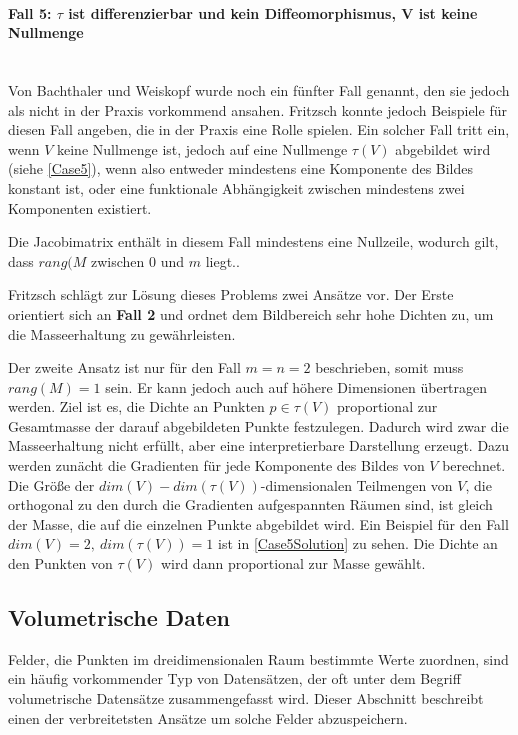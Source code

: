 \documentclass[a4paper,fontsize=12pt,toc=bib,parskip=half,ngerman]{scrartcl}
\begin{document}
\paragraph{Fall 5: $\tau$ ist differenzierbar und kein Diffeomorphismus, V ist keine Nullmenge}\hspace{200pt}\\
Von Bachthaler und Weiskopf wurde noch ein f\"unfter Fall genannt, den sie jedoch als nicht in der Praxis vorkommend ansahen. Fritzsch konnte jedoch Beispiele f\"ur diesen Fall angeben\cite[S.~23~f.]{fritzsch2016continuousScatterplot}, die in der Praxis eine Rolle spielen. Ein solcher Fall tritt ein, wenn $V$ keine Nullmenge ist, jedoch auf eine Nullmenge $\tau(V)$ abgebildet wird (siehe \cref{Case5}), wenn also entweder mindestens eine Komponente des Bildes konstant ist, oder eine funktionale Abh\"angigkeit zwischen mindestens zwei Komponenten existiert. 

Die Jacobimatrix enth\"alt in diesem Fall mindestens eine Nullzeile, wodurch gilt, dass $rang(M$ zwischen 0 und $m$ liegt.. 

Fritzsch schl\"agt zur L\"osung dieses Problems zwei Ans\"atze vor. Der Erste orientiert sich an \textbf{Fall 2} und ordnet dem Bildbereich sehr hohe Dichten zu, um die Masseerhaltung zu gew\"ahrleisten. 

Der zweite Ansatz ist nur f\"ur den Fall $m=n=2$ beschrieben, somit muss $rang(M) = 1$ sein. Er kann jedoch auch auf h\"ohere Dimensionen \"ubertragen werden. Ziel ist es, die Dichte an Punkten $p\in\tau(V)$ proportional zur Gesamtmasse der darauf abgebildeten Punkte festzulegen. Dadurch wird zwar die Masseerhaltung nicht erf\"ullt, aber eine interpretierbare Darstellung erzeugt. Dazu werden zun\"acht die Gradienten f\"ur jede Komponente des Bildes von $V$ berechnet. Die Gr\"o{\ss}e der $dim(V) - dim(\tau(V))$-dimensionalen Teilmengen von $V$, die orthogonal zu den durch die Gradienten aufgespannten R\"aumen sind, ist gleich der Masse, die auf die einzelnen Punkte abgebildet wird. Ein Beispiel f\"ur den Fall $dim(V) = 2,~dim(\tau(V)) = 1$ ist in \cref{Case5Solution} zu sehen. Die Dichte an den Punkten von $\tau(V)$ wird dann proportional zur Masse gew\"ahlt.

\subsection{Volumetrische Daten}
Felder, die Punkten im dreidimensionalen Raum bestimmte Werte zuordnen, sind ein h\"aufig vorkommender Typ von Datens\"atzen, der oft unter dem Begriff \glq volumetrische Datens\"atze\grq{} zusammengefasst wird. Dieser Abschnitt beschreibt einen der verbreitetsten Ans\"atze um solche Felder abzuspeichern.  
\end{document}
